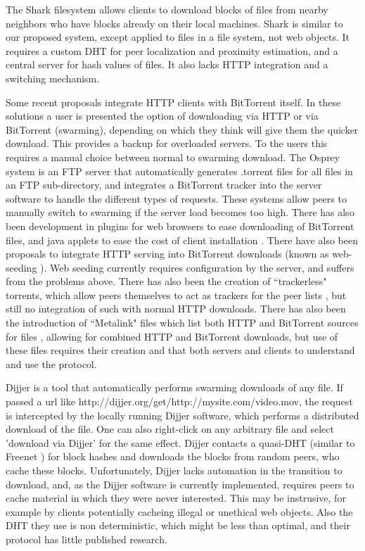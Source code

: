 The Shark \cite{shark} filesystem allows clients to download blocks of files from nearby neighbors who have blocks already on their local machines.  
Shark is similar to our proposed system, except applied to files in a file system, not web objects.  It  requires a custom DHT for peer localization and proximity estimation, 
and a central server for hash values of files.  It also lacks HTTP integration and a switching mechanism.

Some recent proposals integrate HTTP clients with BitTorrent itself.  In these solutions a user is presented the option of downloading via HTTP or via BitTorrent (swarming), 
depending on which they think will give them the quicker download.  This provides a backup for overloaded servers.  To the users this requires a manual choice between normal to 
swarming download.  
The Osprey system \cite{osprey} is an FTP server that automatically generates .torrent files for all files in an FTP sub-directory, 
and integrates a BitTorrent tracker into the server software to handle the different types of requests.  
These systems allow peers to manually switch to swarming if the server load becomes too high.  
There has also been development in plugins for web browsers to ease downloading of BitTorrent files\cite{opera, foxtorrent}, and java applets to ease the cost of client installation \cite{bitlet}.
There have also been proposals to integrate HTTP serving into BitTorrent downloads (known as web-seeding \cite{bittorrent_wikipedia}).  Web seeding currently requires configuration by the server, 
and suffers from the problems above.  There has also been the creation of ``trackerless" torrents, which allow peers themselves to act as trackers for the peer lists \cite{bittorrent_wikipedia}, but still no integration of such
with normal HTTP downloads.  There has also been the introduction of ``Metalink" files which list both HTTP and BitTorrent sources for files \cite{wikipedia_metalink}, 
allowing for combined HTTP and BitTorrent downloads, but use of these files requires their creation and that both servers and clients to understand and use the protocol.

Dijjer \cite{dijjer} is a tool that automatically performs swarming downloads of any file.  
If passed a url like http://dijjer.org/get/http://mysite.com/video.mov, the request is intercepted by the locally running Dijjer software, 
which performs a distributed download of the file.  One can also right-click on any arbitrary file and select 'download via Dijjer' for the same effect.  Dijjer contacts a quasi-DHT (similar to Freenet \cite{freenet}) for block hashes and downloads the blocks from random peers, 
who cache these blocks.  Unfortunately, Dijjer lacks automation in the transition to download, and, as the Dijjer software is currently implemented, requires peers to cache material in which they were never interested.
  This may be instrusive, for example by clients potentially cacheing illegal or unethical web objects.  Also the DHT they use is non deterministic, which might be less than optimal,
  and their protocol has little published research.

